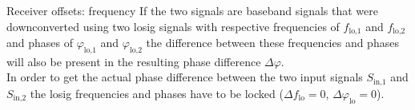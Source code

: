 \begin{subchapter}{Receiver offsets: frequency}
  If the two signals are baseband signals that
  were downconverted using two \gls{losig} signals
  with respective frequencies of $f_\text{lo,1}$ and
  $f_\text{lo,2}$ and phases of $\varphi_\text{lo,1}$
  and $\varphi_\text{lo,2}$ the difference between
  these frequencies and phases will also be present
  in the resulting phase difference $\Delta \varphi$. \\

  In order to get the actual phase difference between
  the two input signals $S_\text{in,1}$ and $S_\text{in,2}$
  the \gls{losig} frequencies and phases have to be
  locked ($\Delta f_\text{lo} = 0$, $\Delta \varphi_\text{lo} = 0$).
\end{subchapter}
